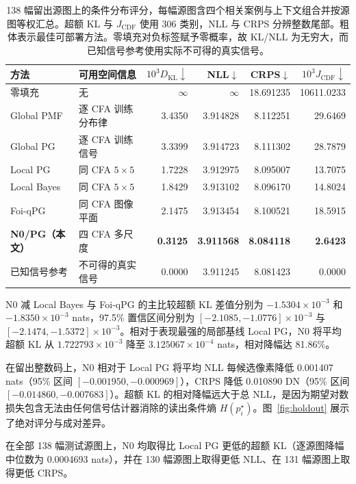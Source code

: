 \documentclass[10pt,twocolumn,journal]{IEEEtran}
\begin{document}
\begin{table}[t]
\centering\small
\caption{138 幅留出源图上的条件分布评分，每幅源图含四个相关案例与上下文组合并按源图等权汇总。超额 KL 与 $J_{\mathrm{CDF}}$ 使用 306 类别，NLL 与 CRPS 分辨整数尾部。粗体表示最佳可部署方法。零填充对负标签赋予零概率，故 KL/NLL 为无穷大，而已知信号参考使用实际不可得的真实信号。}
\label{tab:holdout}
\begin{tabular}{@{}llrrrr@{}}
\toprule
方法 & 可用空间信息 & $10^3D_{\mathrm{KL}}\downarrow$ & NLL$\downarrow$ & CRPS$\downarrow$ & $10^3J_{\mathrm{CDF}}\downarrow$\\
\midrule
零填充 & 无 & $\infty$ & $\infty$ & 18.691235 & 10611.0233\\
Global PMF & 逐 CFA 训练分布律 & 3.4350 & 3.914828 & 8.112251 & 29.6469\\
Global PG & 逐 CFA 训练信号 & 3.3399 & 3.914723 & 8.111302 & 28.7879\\
Local PG & 同 CFA $5\times5$ & 1.7228 & 3.912975 & 8.095007 & 13.7075\\
Local Bayes & 同 CFA $5\times5$ & 1.8429 & 3.913102 & 8.096170 & 14.8024\\
Foi-qPG & 同 CFA 图像平面 & 2.1475 & 3.913454 & 8.100521 & 18.5915\\
\textbf{N0/PG（本文）} & 四 CFA 多尺度 & \textbf{0.3125} & \textbf{3.911568} & \textbf{8.084118} & \textbf{2.6423}\\
已知信号参考 & 不可得的真实信号 & 0.0000 & 3.911245 & 8.081423 & 0.0000\\
\bottomrule
\end{tabular}
\end{table}

N0 减 Local Bayes 与 Foi-qPG 的主比较超额 KL 差值分别为 $-1.5304\times10^{-3}$ 和 $-1.8350\times10^{-3}$ nats，97.5\% 置信区间分别为 $[-2.1085,-1.0776]\times10^{-3}$ 与 $[-2.1474,-1.5372]\times10^{-3}$。相对于表现最强的局部基线 Local PG，N0 将平均超额 KL 从 $1.722793\times10^{-3}$ 降至 $3.125067\times10^{-4}$ nats，相对降幅达 81.86\%。

在留出整数码上，N0 相对于 Local PG 将平均 NLL 每候选像素降低 0.001407 nats（95\% 区间 $[-0.001950,-0.000969]$），CRPS 降低 0.010890 DN（95\% 区间 $[-0.014860,-0.007683]$）。超额 KL 的相对降幅远大于总 NLL，是因为期望对数损失包含无法由任何信号估计器消除的读出条件熵 $H(p_i^\star)$。图~\ref{fig:holdout} 展示了绝对评分与成对差异。

在全部 138 幅测试源图上，N0 均取得比 Local PG 更低的超额 KL（逐源图降幅中位数为 0.0004693 nats），并在 130 幅源图上取得更低 NLL、在 131 幅源图上取得更低 CRPS。
\end{document}
